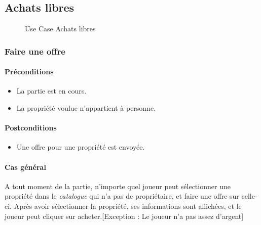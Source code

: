 \documentclass[a4paper,11pt]{report}
\begin{document}
\subsection{Achats libres}
\begin{figure}[ht]
    \caption{Use Case Achats libres}
\end{figure}
\subsubsection{Faire une offre}
\paragraph{Préconditions}
\begin{itemize}
 \item La partie est en cours.
 \item La propriété voulue n'appartient à personne.
\end{itemize}
\paragraph{Postconditions}
\begin{itemize}
 \item Une offre pour une propriété est envoyée.
\end{itemize}
\paragraph{Cas général}
A tout moment de la partie, n'importe quel joueur peut sélectionner une propriété dans le \textit{catalogue} qui n'a pas de propriétaire, et faire une offre sur celle-ci. Après avoir sélectionner la propriété, ses informations sont affichées, et le joueur peut cliquer sur acheter.[Exception : Le joueur n'a pas assez d'argent]
\end{document}
